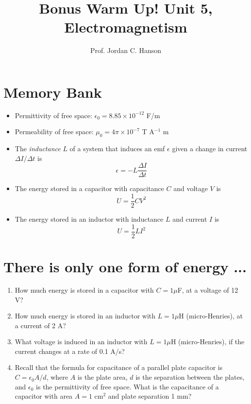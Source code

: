 \documentclass{article}
\begin{document}
\title{Bonus Warm Up!  Unit 5, Electromagnetism}
\author{Prof. Jordan C. Hanson}

\maketitle

\section{Memory Bank}

\begin{itemize}
\item Permittivity of free space: $\epsilon_0 = 8.85 \times 10^
{-12}$ F/m 
\item Permeability of free space: $\mu_0 = 4\pi \times 10^{-7}$ T A$^{-1}$ m
\item The \textit{inductance} $L$ of a system that induces an emf $\epsilon$ given a change in current $\Delta I/\Delta t$ is
\begin{equation}
\epsilon = -L \frac{\Delta I}{\Delta t}
\end{equation}
\item The energy stored in a capacitor with capacitance $C$ and voltage $V$ is
\begin{equation}
U = \frac{1}{2}CV^2
\end{equation}
\item The energy stored in an inductor with inductance $L$ and current $I$ is
\begin{equation}
U = \frac{1}{2}L I^2
\end{equation}
\end{itemize}

\section{There is only one form of energy ...}

\begin{enumerate}
\item How much energy is stored in a capacitor with $C = 1 \mu$F, at a voltage of 12 V? \\ \vspace{1cm}
\item How much energy is stored in an inductor with $L = 1 \mu$H (micro-Henries), at a current of 2 A? \\ \vspace{1cm}
\item What voltage is induced in an inductor with $L = 1 \mu$H (micro-Henries), if the current changes at a rate of 0.1 A/s? \\ \vspace{1cm}
\item Recall that the formula for capacitance of a parallel plate capacitor is $C = \epsilon_0 A/d$, where $A$ is the plate area, $d$ is the separation between the plates, and $\epsilon_0$ is the permittivity of free space.  What is the capacitance of a capacitor with area $A = 1$ cm$^2$ and plate separation 1 mm?
\end{enumerate}
\end{document}
